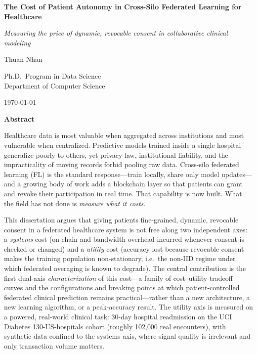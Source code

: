 \documentclass[12pt]{report}
\begin{document}
\begin{titlepage}
    \centering
    \vspace*{3.5cm}
    {\LARGE\bfseries The Cost of Patient Autonomy in Cross-Silo Federated Learning for Healthcare\par}
    \vspace{0.8cm}
    {\large\itshape Measuring the price of dynamic, revocable consent in collaborative clinical modeling\par}
    \vspace{1.8cm}
    {\large Thuan Nhan\par}
    \vspace{2cm}
    {\large Ph.D.\ Program in Data Science\\
            Department of Computer Science\par}
    \vfill
    {\large \today\par}
\end{titlepage}

\begin{center}\textbf{\large Abstract}\end{center}
\vspace{0.5em}

Healthcare data is most valuable when aggregated across institutions and most
vulnerable when centralized. Predictive models trained inside a single hospital
generalize poorly to others, yet privacy law, institutional liability, and the
impracticality of moving records forbid pooling raw data. Cross-silo federated
learning (FL) is the standard response---train locally, share only model
updates---and a growing body of work adds a blockchain layer so that patients can
grant and revoke their participation in real time. That capability is now built.
What the field has not done is \emph{measure what it costs}.

This dissertation argues that giving patients fine-grained, dynamic, revocable
consent in a federated healthcare system is not free along two independent axes:
a \emph{systems} cost (on-chain and bandwidth overhead incurred whenever consent
is checked or changed) and a \emph{utility} cost (accuracy lost because revocable
consent makes the training population non-stationary, i.e.\ the non-IID regime
under which federated averaging is known to degrade). The central contribution is
the first dual-axis \emph{characterization} of this cost---a family of
cost--utility tradeoff curves and the configurations and breaking points at which
patient-controlled federated clinical prediction remains practical---rather than a
new architecture, a new learning algorithm, or a peak-accuracy result. The utility
axis is measured on a powered, real-world clinical task: 30-day hospital
readmission on the UCI Diabetes 130-US-hospitals cohort (roughly 102{,}000 real
encounters), with synthetic data confined to the systems axis, where signal
quality is irrelevant and only transaction volume matters.
\end{document}

